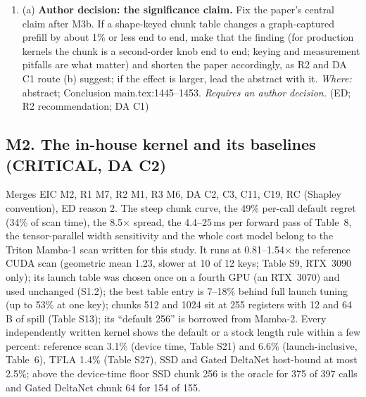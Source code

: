 \documentclass[11pt]{article}
\begin{document}
\begin{enumerate}[label=M1\alph*.]
        PRO~6000 it is $+2.7$ and $-3.7\,\mu$s, zero within noise, so ``$g>o$
        is out of reach'' cannot be claimed there for device-side policies.
        Report the RTX PRO~6000 cost; support ``every tuned shape'' with
        per-shape upper confidence bounds (reference scan: held-out per-shape
        maximum 14.5 against 21\,$\mu$s); say that an isolated synchronization
        is a lower bound on its critical-path cost in device-bound pipelines;
        separate the single-static-chunk baseline of main.tex:1211--1216 from
        the shape-keyed baseline of the lemma's $h(s)$; restate the abstract
        and Sec.~6.7 accordingly. (DA C8; R1 m4; EIC m9)
  \item (a) \textbf{Author decision: the significance claim.} Fix the paper's
        central claim after M3b. If a shape-keyed chunk table changes a
        graph-captured prefill by about 1\% or less end to end, make that the
        finding (for production kernels the chunk is a second-order knob end
        to end; keying and measurement pitfalls are what matter) and shorten
        the paper accordingly, as R2 and DA C1 route (b) suggest; if the
        effect is larger, lead the abstract with it. \emph{Where:} abstract;
        Conclusion main.tex:1445--1453. \emph{Requires an author decision.}
        (ED; R2 recommendation; DA C1)
\end{enumerate}

\subsection*{M2. The in-house kernel and its baselines (CRITICAL, DA C2)}
Merges EIC M2, R1 M7, R2 M1, R3 M6, DA C2, C3, C11, C19, RC (Shapley
convention), ED reason 2. The steep chunk curve, the 49\% per-call default
regret (34\% of scan time), the 8.5$\times$ spread, the 4.4--25\,ms per
forward pass of Table~8, the tensor-parallel width sensitivity and the whole
cost model belong to the Triton Mamba-1 scan written for this study. It runs
at 0.81--1.54$\times$ the reference CUDA scan (geometric mean 1.23, slower at
10 of 12 keys; Table S9, RTX~3090 only); its launch table was chosen once on a
fourth GPU (an RTX~3070) and used unchanged (S1.2); the best table entry is
7--18\% behind full launch tuning (up to 53\% at one key); chunks 512 and 1024
sit at 255 registers with 12 and 64\,B of spill (Table S13); its ``default
256'' is borrowed from Mamba-2. Every independently written kernel shows the
default or a stock length rule within a few percent: reference scan 3.1\%
(device time, Table S21) and 6.6\% (launch-inclusive, Table~6), TFLA 1.4\%
(Table S27), SSD and Gated DeltaNet host-bound at most 2.5\%; above the
device-time floor SSD chunk 256 is the oracle for 375 of 397 calls and Gated
DeltaNet chunk 64 for 154 of 155.
\end{document}

